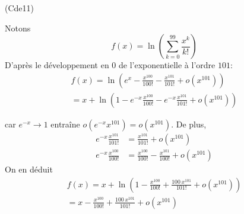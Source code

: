 \begin{tiny}(Cde11)\end{tiny} Notons 
\begin{displaymath}
 f(x)= \ln\left( \sum_{k=0}^{99}\frac{x^k}{k!}\right)
\end{displaymath}
D'après le développement en $0$ de l'exponentielle à l'ordre $101$:
\begin{multline*}
 f(x)=\ln\left(e^x -\frac{x^{100}}{100!}-\frac{x^{101}}{101!} +o(x^{101})\right) \\
= x+\ln\left(1 -e^{-x}\frac{x^{100}}{100!}-e^{-x}\frac{x^{101}}{101!} +o(x^{101})\right)
\end{multline*}

car $e^{-x}\rightarrow 1$ entraîne $o(e^{-x}x^{101})=o(x^{101})$. De plus,
\begin{align*}
 e^{-x}\frac{x^{101}}{101!}&= \frac{x^{101}}{101!} +o(x^{101})\\
 e^{-x}\frac{x^{100}}{100!}&= \frac{x^{100}}{100!}-\frac{x^{101}}{100!} +o(x^{101})
\end{align*}
On en déduit
\begin{multline*}
 f(x)=x+\ln\left(1- \frac{x^{100}}{100!}+\frac{100\,x^{101}}{101!}+o(x^{101})\right)\\
 = x - \frac{x^{100}}{100!}+\frac{100\,x^{101}}{101!}+o(x^{101})
\end{multline*}

